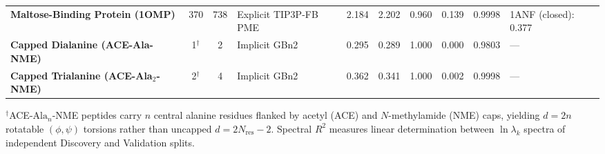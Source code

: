 \documentclass[10pt,letterpaper]{article}
\begin{document}
\begin{table}[!htbp]
{\begin{tabular}{@{}l c c l c c c c c l@{}}
\textbf{Maltose-Binding Protein (1OMP)} & 370 & 738 & Explicit TIP3P-FB PME & 2.184 & 2.202 & 0.960 & 0.139 & 0.9998 & 1ANF (closed): 0.377 \\
\textbf{Capped Dialanine (ACE-Ala-NME)} & 1$^{\dag}$ & 2 & Implicit GBn2 & 0.295 & 0.289 & 1.000 & 0.000 & 0.9803 & --- \\
\textbf{Capped Trialanine (ACE-Ala$_2$-NME)} & 2$^{\dag}$ & 4 & Implicit GBn2 & 0.362 & 0.341 & 1.000 & 0.002 & 0.9998 & --- \\
\bottomrule[1.1pt]
\end{tabular}%
}
\begin{flushleft}
{\scriptsize $^\dag$ACE-$\text{Ala}_n$-NME peptides carry $n$ central alanine residues flanked by acetyl (ACE) and $N$-methylamide (NME) caps, yielding $d = 2n$ rotatable $(\phi,\psi)$ torsions rather than uncapped $d = 2N_{\mathrm{res}}-2$. Spectral $R^2$ measures linear determination between $\ln\lambda_k$ spectra of independent Discovery and Validation splits.}
\end{flushleft}
\end{table}
\end{document}
